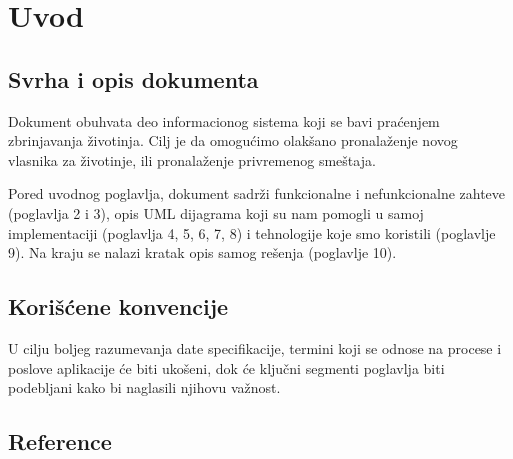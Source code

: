 \section{Uvod}
\subsection{Svrha i opis dokumenta}
\par Dokument obuhvata deo informacionog sistema koji se bavi praćenjem zbrinjavanja životinja. Cilj je da omogućimo olakšano pronalaženje novog vlasnika za životinje, ili
pronalaženje privremenog smeštaja.
\par Pored uvodnog poglavlja, dokument sadrži funkcionalne i nefunkcionalne zahteve (poglavlja 2 i 3), opis UML dijagrama koji su nam pomogli u samoj 
implementaciji (poglavlja 4, 5, 6, 7, 8) i tehnologije koje smo koristili (poglavlje 9). Na kraju se nalazi kratak opis samog rešenja (poglavlje 10).
\subsection{Korišćene konvencije}
\par U cilju boljeg razumevanja date specifikacije, termini koji se odnose na procese i poslove aplikacije će biti ukošeni, dok će ključni segmenti poglavlja
biti podebljani kako bi naglasili njihovu važnost.
\subsection{Reference}